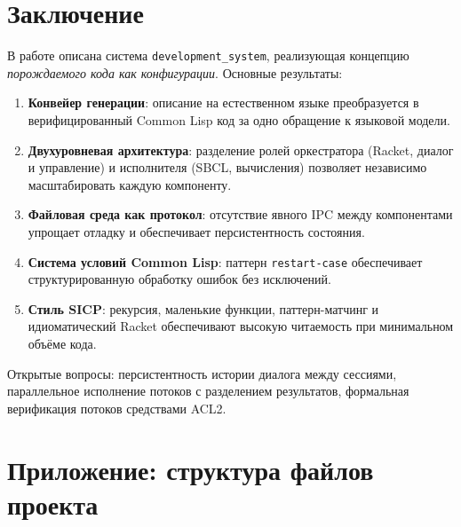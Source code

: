 \documentclass[11pt,a4paper]{article}
\newcommand{\devs}{\texttt{development\allowbreak\_\allowbreak system}}
\begin{document}
\section{Заключение}

В работе описана система \devs, реализующая концепцию
\emph{порождаемого кода как конфигурации}. Основные результаты:

\begin{enumerate}
  \item \textbf{Конвейер генерации}: описание на естественном языке
    преобразуется в верифицированный Common Lisp код за одно обращение
    к языковой модели.

  \item \textbf{Двухуровневая архитектура}: разделение ролей оркестратора
    (Racket, диалог и управление) и исполнителя (SBCL, вычисления) позволяет
    независимо масштабировать каждую компоненту.

  \item \textbf{Файловая среда как протокол}: отсутствие явного IPC между
    компонентами упрощает отладку и обеспечивает персистентность состояния.

  \item \textbf{Система условий Common Lisp}: паттерн \texttt{restart-case}
    обеспечивает структурированную обработку ошибок без исключений.

  \item \textbf{Стиль SICP}: рекурсия, маленькие функции, паттерн-матчинг
    и идиоматический Racket обеспечивают высокую читаемость при минимальном
    объёме кода.
\end{enumerate}

Открытые вопросы: персистентность истории диалога между сессиями,
параллельное исполнение потоков с разделением результатов, формальная
верификация потоков средствами ACL2.

\section*{Приложение: структура файлов проекта}
\end{document}
